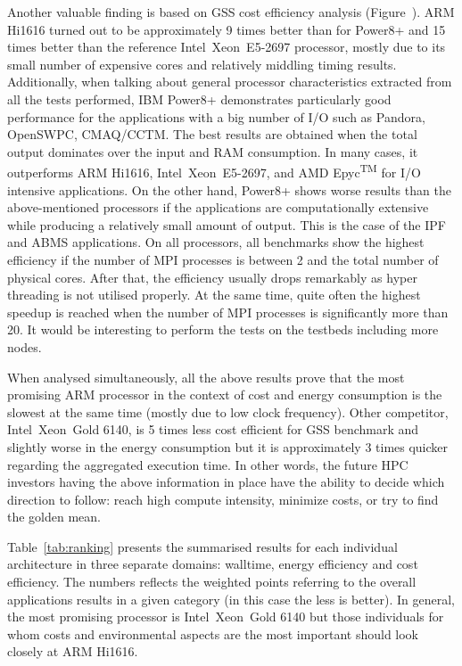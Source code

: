 Another valuable finding is based on GSS cost efficiency analysis (Figure~). ARM Hi1616 turned out to be approximately 9 times better than for Power8+ and 15 times better than the reference Intel\textregistered\ Xeon\textregistered\ E5-2697 processor, mostly due to its small number of expensive cores and relatively middling timing results.
Additionally, when talking about general processor characteristics extracted from all the tests performed, IBM Power8+ demonstrates particularly good performance for the applications with a big number of I/O such as Pandora, OpenSWPC, CMAQ/CCTM. The best results are obtained when the total output dominates over the input and RAM consumption. In many cases, it outperforms ARM Hi1616, Intel\textregistered\ Xeon\textregistered\ E5-2697, and AMD Epyc\textsuperscript{TM} for I/O intensive applications. On the other hand, Power8+ shows worse results than the above-mentioned processors if the applications are computationally extensive while producing a relatively small amount of output. This is the case of the IPF and ABMS applications. On all processors, all benchmarks show the highest efficiency if the number of MPI processes is between 2 and the total number of physical cores. After that, the efficiency usually drops remarkably as hyper threading is not utilised properly. At the same time, quite often the highest speedup is reached when the number of MPI processes is significantly more than 20. It would be interesting to perform the tests on the testbeds including more nodes. 



When analysed simultaneously, all the above results prove that the most promising ARM processor in the context of cost and energy consumption is the slowest at the same time (mostly due to low clock frequency). Other competitor, Intel\textregistered\ Xeon\textregistered\ Gold 6140, is 5 times less cost efficient for GSS benchmark and slightly worse in the energy consumption but it is approximately 3 times quicker regarding the aggregated execution time. In other words, the future HPC investors having the above information in place have the ability to decide which direction to follow: reach high compute intensity, minimize costs, or try to find the golden mean.

Table~\ref{tab:ranking} presents the summarised results for each individual architecture in three separate domains: walltime, energy efficiency and cost efficiency. The numbers reflects the weighted points referring to the overall applications results in a given category (in this case the less is better). In general, the most promising processor is Intel\textregistered\ Xeon\textregistered\ Gold 6140 but those individuals for whom costs and environmental aspects are the most important should look closely at ARM Hi1616.
    
